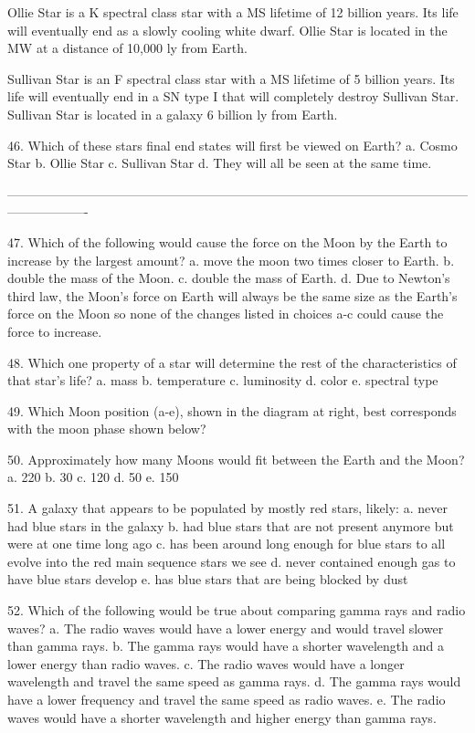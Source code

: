 Ollie Star is a K spectral class star with a MS lifetime of 12 billion years.  Its life will eventually end as a slowly cooling white dwarf.  Ollie Star is located in the MW at a distance of 10,000 ly from Earth.

Sullivan Star is an F spectral class star with a MS lifetime of 5 billion years.  Its life will eventually end in a SN type I that will completely destroy Sullivan Star.  Sullivan Star is located in a galaxy 6 billion ly from Earth.

46. Which of these stars final end states will first be viewed on Earth?
a. Cosmo Star
b. Ollie Star
c. Sullivan Star
d. They will all be seen at the same time.

-------------------------------------------------------------------------------------------------------------------------------

47. Which of the following would cause the force on the Moon by the Earth to increase by the largest amount?
a. move the moon two times closer to Earth.
b. double the mass of the Moon. 
c. double the mass of Earth.
d. Due to Newton’s third law, the Moon’s force on Earth will always be the same size as the Earth’s force on the Moon so none of the changes listed in choices a-c could cause the force to increase.

48. Which one property of a star will determine the rest of the characteristics of that star’s life?
a. mass
b. temperature
c. luminosity
d. color
e. spectral type


49. Which Moon position (a-e), shown in the diagram at right, best corresponds with the moon phase shown below? 













50. Approximately how many Moons would fit between the Earth and the Moon?
a. 220
b. 30
c. 120
d. 50
e. 150


51. A galaxy that appears to be populated by mostly red stars, likely:
a. never had blue stars in the galaxy 
b. had blue stars that are not present anymore but were at one time long ago
c. has been around long enough for blue stars to all evolve into the red main sequence stars we see 
d. never contained enough gas to have blue stars develop
e. has blue stars that are being blocked by dust



52. Which of the following would be true about comparing gamma rays and radio waves? 
a. The radio waves would have a lower energy and would travel slower than gamma rays.
b. The gamma rays would have a shorter wavelength and a lower energy than radio waves.
c. The radio waves would have a longer wavelength and travel the same speed as gamma rays.
d. The gamma rays would have a lower frequency and travel the same speed as radio waves. 
e. The radio waves would have a shorter wavelength and higher energy than gamma rays.


